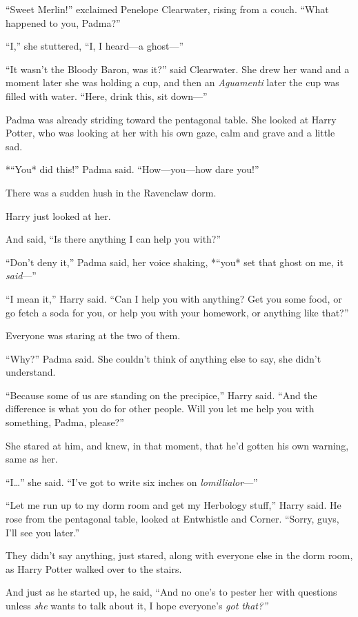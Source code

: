 ``Sweet Merlin!'' exclaimed Penelope Clearwater, rising from a couch.
``What happened to you, Padma?''

``I,'' she stuttered, ``I, I heard---a ghost---''

``It wasn't the Bloody Baron, was it?'' said Clearwater. She drew her
wand and a moment later she was holding a cup, and then an
\emph{Aguamenti} later the cup was filled with water. ``Here, drink
this, sit down---''

Padma was already striding toward the pentagonal table. She looked at
Harry Potter, who was looking at her with his own gaze, calm and grave
and a little sad.

*``You* did this!'' Padma said. ``How---you---how dare you!''

There was a sudden hush in the Ravenclaw dorm.

Harry just looked at her.

And said, ``Is there anything I can help you with?''

``Don't deny it,'' Padma said, her voice shaking, *``you* set that ghost
on me, it \emph{said}---''

``I mean it,'' Harry said. ``Can I help you with anything? Get you some
food, or go fetch a soda for you, or help you with your homework, or
anything like that?''

Everyone was staring at the two of them.

``Why?'' Padma said. She couldn't think of anything else to say, she
didn't understand.

``Because some of us are standing on the precipice,'' Harry said. ``And
the difference is what you do for other people. Will you let me help you
with something, Padma, please?''

She stared at him, and knew, in that moment, that he'd gotten his own
warning, same as her.

``I\ldots{}'' she said. ``I've got to write six inches on
\emph{lomillialor}---''

``Let me run up to my dorm room and get my Herbology stuff,'' Harry
said. He rose from the pentagonal table, looked at Entwhistle and
Corner. ``Sorry, guys, I'll see you later.''

They didn't say anything, just stared, along with everyone else in the
dorm room, as Harry Potter walked over to the stairs.

And just as he started up, he said, ``And no one's to pester her with
questions unless \emph{she} wants to talk about it, I hope everyone's
\emph{got that?''}

